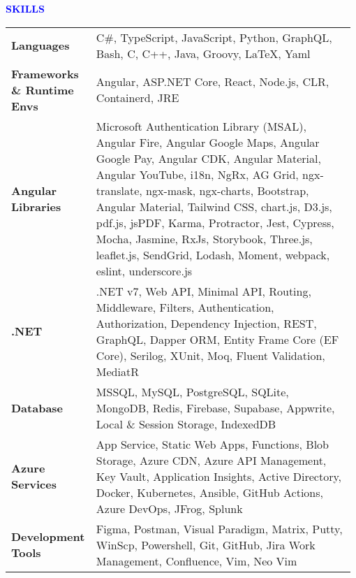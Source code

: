 \documentclass{article}
\newcommand{\fontMediumBold}[1]{{\fontsize{15}{18}\selectfont\bfseries #1}}
\begin{document}
\vspace{10pt}
  \fontMediumBold{\textcolor{blue}{SKILLS \hrulefill}}
\vspace{5pt}\\
\setlength{\tabcolsep}{0pt}
\begin{tabular}{@{}p{0.23\linewidth}@{\hspace{5pt}}p{0.755\linewidth}@{}}
  \textbf{Languages} & {C\#, TypeScript, JavaScript, Python, GraphQL, Bash, C, C++, Java, Groovy, LaTeX, Yaml} \\
  \textbf{Frameworks \& Runtime Envs} & {Angular, ASP.NET Core, React, Node.js, CLR, Containerd, JRE} \\
  \textbf{Angular Libraries} & {Microsoft Authentication Library (MSAL), Angular Fire, Angular Google Maps, Angular Google Pay, Angular CDK, Angular Material, Angular YouTube, i18n, NgRx, AG Grid, ngx-translate, ngx-mask, ngx-charts, Bootstrap, Angular Material, Tailwind CSS, chart.js, D3.js, pdf.js, jsPDF, Karma, Protractor, Jest, Cypress, Mocha, Jasmine, RxJs, Storybook, Three.js, leaflet.js, SendGrid, Lodash, Moment, webpack, eslint, underscore.js} \\
  \textbf{.NET} & {.NET v7, Web API, Minimal API, Routing, Middleware, Filters, Authentication, Authorization, Dependency Injection, REST, GraphQL, Dapper ORM, Entity Frame Core (EF Core), Serilog, XUnit, Moq, Fluent Validation, MediatR} \\
  \textbf{Database} & {MSSQL, MySQL, PostgreSQL, SQLite, MongoDB, Redis, Firebase, Supabase, Appwrite, Local \& Session Storage, IndexedDB} \\
  \textbf{Azure Services} & {App Service, Static Web Apps, Functions, Blob Storage, Azure CDN, Azure API Management, Key Vault, Application Insights, Active Directory, Docker, Kubernetes, Ansible, GitHub Actions, Azure DevOps, JFrog, Splunk} \\
  \textbf{Development Tools} & {Figma, Postman, Visual Paradigm, Matrix, Putty, WinScp, Powershell, Git, GitHub, Jira Work Management, Confluence, Vim, Neo Vim} \\
\end{tabular}\\
\end{document}
